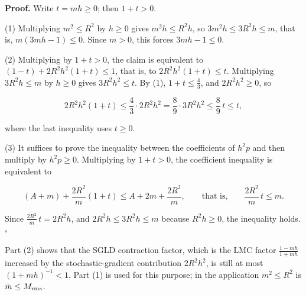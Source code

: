 \documentclass[11pt,a4paper]{article}
\begin{document}
\textbf{Proof.} Write \(t=mh\ge0\); then \(1+t>0\).




(1) Multiplying \(m^2\le R^2\) by \(h\ge0\) gives \(m^2h\le R^2h\), so \(3m^2h\le3R^2h\le m\), that is, \(m(3mh-1)\le0\). Since \(m>0\), this forces \(3mh-1\le0\).




(2) Multiplying by \(1+t>0\), the claim is equivalent to \((1-t)+2R^2h^2(1+t)\le1\), that is, to \(2R^2h^2(1+t)\le t\). Multiplying \(3R^2h\le m\) by \(h\ge0\) gives \(3R^2h^2\le t\). By (1), \(1+t\le\frac43\), and \(2R^2h^2\ge0\), so


\[2R^2h^2(1+t)\le\frac43\cdot2R^2h^2=\frac89\cdot3R^2h^2\le\frac89\,t\le t,\]


where the last inequality uses \(t\ge0\).




(3) It suffices to prove the inequality between the coefficients of \(h^2p\) and then multiply by \(h^2p\ge0\). Multiplying by \(1+t>0\), the coefficient inequality is equivalent to


\[(A+m)+\frac{2R^2}m(1+t)\le A+2m+\frac{2R^2}m,\qquad\text{that is,}\qquad\frac{2R^2}m\,t\le m.\]


Since \(\frac{2R^2}m\,t=2R^2h\), and \(2R^2h\le3R^2h\le m\) because \(R^2h\ge0\), the inequality holds. \(\square\)




Part (2) shows that the SGLD contraction factor, which is the LMC factor \(\frac{1-mh}{1+mh}\) increased by the stochastic-gradient contribution \(2R^2h^2\), is still at most \((1+mh)^{-1}<1\). Part (1) is used for this purpose; in the application \(m^2\le R^2\) is \(\bar m\le M_{\rm rms}\).
\end{document}
